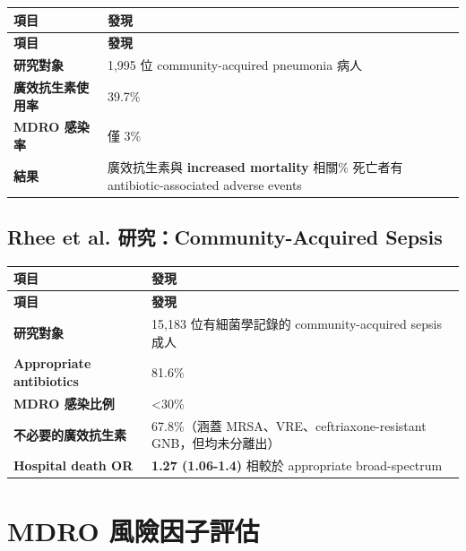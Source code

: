 \documentclass[12pt,a4paper]{article}
\begin{document}
\begin{longtable}{p{5cm}p{9cm}}
\toprule
\textbf{項目} & \textbf{發現} \\
\midrule
\endfirsthead

\toprule
\textbf{項目} & \textbf{發現} \\
\midrule
\endhead

\bottomrule
\endfoot

\textbf{研究對象} & 1,995 位 community-acquired pneumonia 病人 \\
\midrule
\textbf{廣效抗生素使用率} & 39.7\% \\
\midrule
\textbf{MDRO 感染率} & 僅 3\% \\
\midrule
\textbf{結果} & 廣效抗生素與 \textbf{increased mortality} 相關\newline
17.5\% 死亡者有 antibiotic-associated adverse events \\
\bottomrule
\end{longtable}

\subsection{Rhee et al. 研究：Community-Acquired Sepsis}

\begin{longtable}{p{5cm}p{9cm}}
\toprule
\textbf{項目} & \textbf{發現} \\
\midrule
\endfirsthead

\toprule
\textbf{項目} & \textbf{發現} \\
\midrule
\endhead

\bottomrule
\endfoot

\textbf{研究對象} & 15,183 位有細菌學記錄的 community-acquired sepsis 成人 \\
\midrule
\textbf{Appropriate antibiotics} & 81.6\% \\
\midrule
\textbf{MDRO 感染比例} & <30\% \\
\midrule
\textbf{不必要的廣效抗生素} & 67.8\%（涵蓋 MRSA、VRE、ceftriaxone-resistant GNB，但均未分離出）\\
\midrule
\textbf{Hospital death OR} & \textbf{1.27 (1.06-1.4)} 相較於 appropriate broad-spectrum \\
\bottomrule
\end{longtable}

\section{MDRO 風險因子評估}
\end{document}
